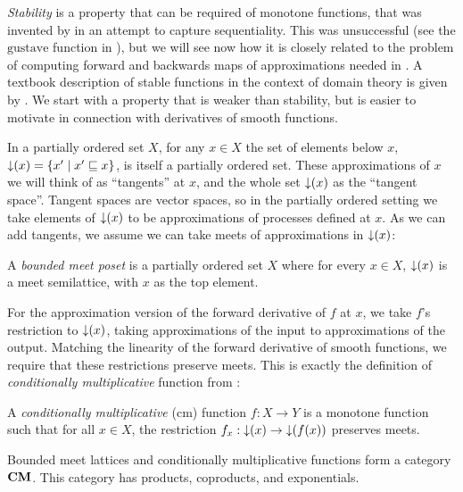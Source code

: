 \emph{Stability} is a property that can be required of monotone functions, that was invented by \citet{berry79} in an attempt to capture sequentiality. This was unsuccessful (see the $\mathrm{gustave}$ function in ), but we will see now how it is closely related to the problem of computing forward and backwards maps of approximations needed in \GPS. A textbook description of stable functions in the context of domain theory is given by \citet[Chapter 12]{amadio-curien}. We start with a property that is weaker than stability, but is easier to motivate in connection with derivatives of smooth functions.

In a partially ordered set $X$, for any $x \in X$ the set of elements below $x$, $\mathop{\downarrow}(x) = \{ x' \mid x' \sqsubseteq x \}$, is itself a partially ordered set. These approximations of $x$ we will think of as ``tangents'' at $x$, and the whole set $\mathop{\downarrow}(x)$ as the ``tangent space''. Tangent spaces are vector spaces, so in the partially ordered setting we take elements of $\mathop{\downarrow}(x)$ to be approximations of processes defined at $x$. As we can add tangents, we assume we can take meets of approximations in $\mathop{\downarrow}(x)$:


\begin{definition}
  A \emph{bounded meet poset} is a partially ordered set $X$ where for
  every $x \in X$, $\mathop{\downarrow}(x)$ is a meet semilattice, with $x$ as
  the top element.
\end{definition}

For the approximation version of the forward derivative of $f$ at $x$, we take $f$'s restriction to $\mathop{\downarrow}(x)$, taking approximations of the input to approximations of the output. Matching the linearity of the forward derivative of smooth functions, we require that these restrictions preserve meets. This is exactly the definition of \emph{conditionally multiplicative} function from \citet{berry79}:

\begin{definition}
  A \emph{conditionally multiplicative} (cm) function $f : X \to Y$ is
  a monotone function such that for all $x \in X$, the restriction
  $f_x : \mathop{\downarrow}(x) \to \mathop{\downarrow}(f(x))$ preserves meets.
\end{definition}

\begin{theorem}
  Bounded meet lattices and conditionally multiplicative functions form
  a category $\mathbf{CM}$. This category has products, coproducts, and
  exponentials.
\end{theorem}

